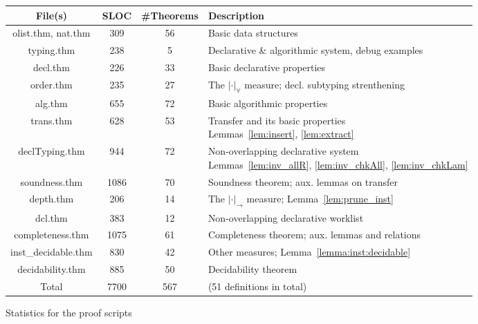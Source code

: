 \begin{figure}[ht]
\centering\begin{tabular}{|c|c|c|l|}\hline
    File(s) & SLOC & \#Theorems & Description\\\hline
    olist.thm, nat.thm  &  309 & 56  & Basic data structures\\\hline
    typing.thm          &  238 & 5   & Declarative \& algorithmic system, debug examples\\\hline
    decl.thm            &  226 & 33  & Basic declarative properties\\\hline
    order.thm           &  235 & 27  & The $|\cdot|_\forall$ measure; decl. subtyping strenthening\\\hline
    alg.thm             &  655 & 72  & Basic algorithmic properties\\\hline
    trans.thm           &  628 & 53  & \makecell[l]{Transfer and its basic properties \\
                            Lemmas~\ref{lem:insert}, \ref{lem:extract}}\\\hline
    declTyping.thm      &  944 & 72  & \makecell[l]{Non-overlapping declarative system \\
                            Lemmas~\ref{lem:inv_allR}, \ref{lem:inv_chkAll}, \ref{lem:inv_chkLam}}\\\hline
    soundness.thm       & 1086 & 70  & Soundness theorem; aux. lemmas on transfer\\\hline
    depth.thm           &  206 & 14  & The $|\cdot|_\to$ measure; Lemma~\ref{lem:prune_inst}\\\hline
    dcl.thm             &  383 & 12  & Non-overlapping declarative worklist \\\hline
    completeness.thm    & 1075 & 61  &
                            Completeness theorem; aux. lemmas and relations\\\hline
    inst\_decidable.thm &  830 & 42  & Other measures; Lemma~\ref{lemma:inst:decidable}\\\hline
    decidability.thm    &  885 & 50  & Decidability theorem\\\hline
    Total               & 7700 & 567 & (51 definitions in total)\\\hline
\end{tabular}
\caption{Statistics for the proof scripts}
\label{fig:proof_statistics}
\end{figure}
